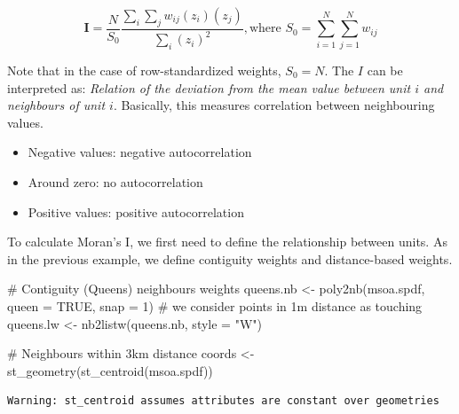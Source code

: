 \documentclass[
  letterpaper,
  DIV=11,
  numbers=noendperiod]{scrreprt}
\newenvironment{Shaded}{\begin{snugshade}}{\end{snugshade}}
\newcommand{\AttributeTok}[1]{\textcolor[rgb]{0.40,0.45,0.13}{#1}}
\newcommand{\CommentTok}[1]{\textcolor[rgb]{0.37,0.37,0.37}{#1}}
\newcommand{\ConstantTok}[1]{\textcolor[rgb]{0.56,0.35,0.01}{#1}}
\newcommand{\DecValTok}[1]{\textcolor[rgb]{0.68,0.00,0.00}{#1}}
\newcommand{\FunctionTok}[1]{\textcolor[rgb]{0.28,0.35,0.67}{#1}}
\newcommand{\NormalTok}[1]{\textcolor[rgb]{0.00,0.23,0.31}{#1}}
\newcommand{\OtherTok}[1]{\textcolor[rgb]{0.00,0.23,0.31}{#1}}
\newcommand{\StringTok}[1]{\textcolor[rgb]{0.13,0.47,0.30}{#1}}
\begin{document}
\[      
        \begin{equation} 
        \boldsymbol{\mathbf{I}}  = \frac{N}{S_0}  
        \frac{\sum_i\sum_j w_{ij}(z_i)(z_j)}
            {\sum_i (z_i)^2}, \text{where } S_0 = \sum_{i=1}^N\sum_{j=1}^N w_{ij}
        \end{equation}
\]

Note that in the case of row-standardized weights, \(S_0 = N\). The
\(I\) can be interpreted as: \emph{Relation of the deviation from the
mean value between unit \(i\) and neighbours of unit \(i\)}. Basically,
this measures correlation between neighbouring values.

\begin{itemize}
\item
  Negative values: negative autocorrelation
\item
  Around zero: no autocorrelation
\item
  Positive values: positive autocorrelation
\end{itemize}

To calculate Moran's I, we first need to define the relationship between
units. As in the previous example, we define contiguity weights and
distance-based weights.

\begin{Shaded}
\begin{Highlighting}[]
\CommentTok{\# Contiguity (Queens) neighbours weights}
\NormalTok{queens.nb }\OtherTok{\textless{}{-}} \FunctionTok{poly2nb}\NormalTok{(msoa.spdf, }
                     \AttributeTok{queen =} \ConstantTok{TRUE}\NormalTok{, }
                     \AttributeTok{snap =} \DecValTok{1}\NormalTok{) }\CommentTok{\# we consider points in 1m distance as \textquotesingle{}touching\textquotesingle{}}
\NormalTok{queens.lw }\OtherTok{\textless{}{-}} \FunctionTok{nb2listw}\NormalTok{(queens.nb,}
                      \AttributeTok{style =} \StringTok{"W"}\NormalTok{)}

\CommentTok{\# Neighbours within 3km distance}
\NormalTok{coords }\OtherTok{\textless{}{-}} \FunctionTok{st\_geometry}\NormalTok{(}\FunctionTok{st\_centroid}\NormalTok{(msoa.spdf))}
\end{Highlighting}
\end{Shaded}

\begin{verbatim}
Warning: st_centroid assumes attributes are constant over geometries
\end{verbatim}
\end{document}

